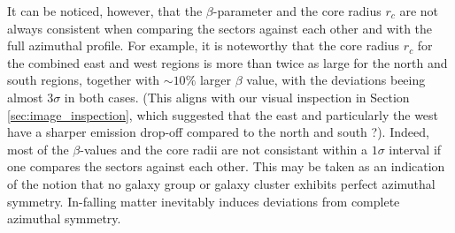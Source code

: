 %
\begin{table}[htbp]
    \centering
    \caption{Fit parameters, their errors, and the reduced chi-squared value.}
    \label{table:full_sec_fit_parameters}
\end{table}
%
It can be noticed, however, that the \(\beta\)-parameter and the core radius \(r_c\) are not always consistent when comparing the sectors against each other and with the full azimuthal profile. For example, it is noteworthy that the core radius \(r_c\) for the combined east and west regions is more than twice as large for the north and south regions, together with \(\sim 10\%\) larger \(\beta\) value, with the deviations beeing almost \(3\sigma\) in both cases. (This aligns with our visual inspection in Section \ref{sec:image_inspection}, which suggested that the east and particularly the west have a sharper emission drop-off compared to the north and south ?). Indeed, most of the \(\beta\)-values and the core radii are not consistant within a \(1\sigma\) interval if one compares the sectors against each other. This may be taken as an indication of the notion that no galaxy group or galaxy cluster exhibits perfect azimuthal symmetry. In-falling matter inevitably induces deviations from complete azimuthal symmetry.
